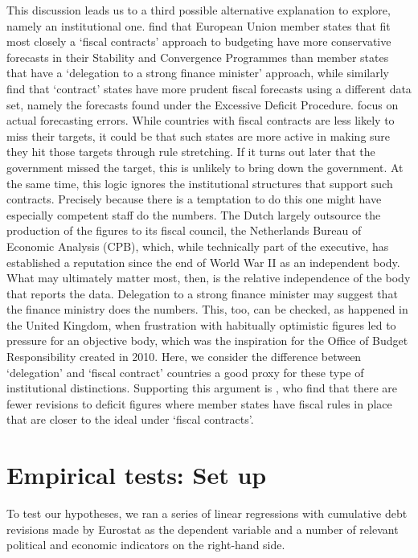 \documentclass[]{article}
\begin{document}
This discussion leads us to a third possible alternative explanation to explore, namely an  institutional one. \cite{hallerbergstrauch2009} find that European Union member states that fit most closely a `fiscal contracts' approach to budgeting have more conservative forecasts in their Stability and Convergence Programmes than member states that have a `delegation to a strong finance minister' approach, while \cite{PinaVenes2011} similarly find that `contract' states have more prudent fiscal forecasts using a different data set, namely the forecasts found under the Excessive Deficit Procedure. \cite{hallerbergstrauch2009} focus on actual forecasting errors. While countries with fiscal contracts are less likely to miss their targets, it could be that such states are more active in making sure they hit those targets through rule stretching.  If it turns out later that the government missed the target, this is unlikely to bring down the government. At the same time, this logic ignores the institutional structures that support such contracts. Precisely because  there is a temptation to do this one might have especially competent staff do the numbers. The Dutch largely outsource the production of the figures to its fiscal council, the Netherlands Bureau of Economic Analysis (CPB), which, while technically part of the executive, has established a reputation since the end of World War II as an independent body. What may ultimately matter most, then, is the relative independence of the body that reports the data. Delegation to a strong finance minister may suggest that the finance ministry does the numbers. This, too, can be checked, as happened in the United Kingdom, when frustration with habitually optimistic figures led to pressure for an objective body, which was the inspiration for the Office of Budget Responsibility created in 2010. Here, we consider the difference between `delegation' and `fiscal contract' countries a good proxy for these type of institutional distinctions. Supporting this argument is \cite{DeCastro2013}, who find that there are fewer revisions to deficit figures where member states have fiscal rules in place that are closer to the ideal under `fiscal contracts'.

\section{Empirical tests: Set up}

To test our hypotheses, we ran a series of linear regressions with cumulative debt revisions made by Eurostat as the dependent variable and a number of relevant political and economic indicators on the right-hand side.
\end{document}
